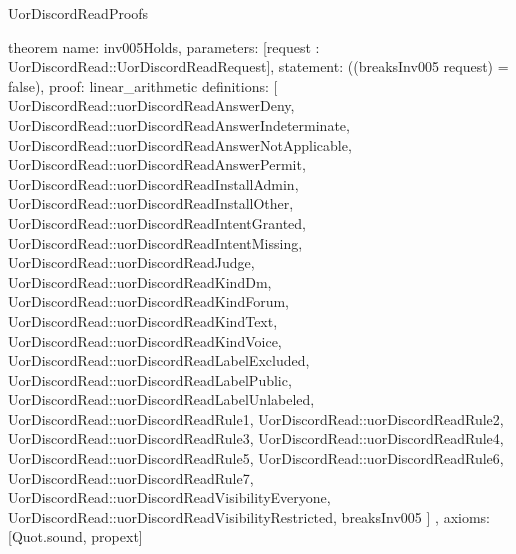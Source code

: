 \begin{lexlean}{UorDiscordReadProofs}
\begin{semanticmodule}
theorem{
  name: inv005Holds,
  parameters: [request : UorDiscordRead::UorDiscordReadRequest],
  statement: ((breaksInv005 request) = false),
  proof: linear_arithmetic{
    definitions: [
      UorDiscordRead::uorDiscordReadAnswerDeny,
      UorDiscordRead::uorDiscordReadAnswerIndeterminate,
      UorDiscordRead::uorDiscordReadAnswerNotApplicable,
      UorDiscordRead::uorDiscordReadAnswerPermit,
      UorDiscordRead::uorDiscordReadInstallAdmin,
      UorDiscordRead::uorDiscordReadInstallOther,
      UorDiscordRead::uorDiscordReadIntentGranted,
      UorDiscordRead::uorDiscordReadIntentMissing,
      UorDiscordRead::uorDiscordReadJudge,
      UorDiscordRead::uorDiscordReadKindDm,
      UorDiscordRead::uorDiscordReadKindForum,
      UorDiscordRead::uorDiscordReadKindText,
      UorDiscordRead::uorDiscordReadKindVoice,
      UorDiscordRead::uorDiscordReadLabelExcluded,
      UorDiscordRead::uorDiscordReadLabelPublic,
      UorDiscordRead::uorDiscordReadLabelUnlabeled,
      UorDiscordRead::uorDiscordReadRule1,
      UorDiscordRead::uorDiscordReadRule2,
      UorDiscordRead::uorDiscordReadRule3,
      UorDiscordRead::uorDiscordReadRule4,
      UorDiscordRead::uorDiscordReadRule5,
      UorDiscordRead::uorDiscordReadRule6,
      UorDiscordRead::uorDiscordReadRule7,
      UorDiscordRead::uorDiscordReadVisibilityEveryone,
      UorDiscordRead::uorDiscordReadVisibilityRestricted,
      breaksInv005
    ]
  },
  axioms: [Quot.sound, propext]
}
\end{semanticmodule}
\end{lexlean}
